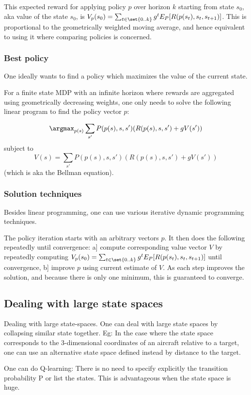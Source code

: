 \documentclass[oneside, article]{memoir}
\begin{document}
This expected reward for applying policy $p$ over horizon $k$ starting from state $s_0$, aka value of the state $s_0$, is $V_p(s_0) = \sum_{t \in \set{0..k}} g^t E_P[R(p(s_t), s_t, s_{t+1})]$. This is proportional to the geometrically weighted moving average, and hence equivalent to using it where comparing policies is concerned.

\subsubsection{Best policy}
One ideally wants to find a policy which maximizes the value of the current state.

For a finite state MDP with an infinite horizon where rewards are aggregated using geometrically decreasing weights, one only needs to solve the following linear program to find the policy vector $p$:

$$\argmax_{p(s)} \sum_{s'} P(p(s), s, s')(R(p(s), s, s') + gV(s'))$$ subject to $$V(s) = \sum_{s'} P(p(s), s, s')(R(p(s), s, s') + gV(s'))$$ (which is aka the Bellman equation).

\subsubsection{Solution techniques}
Besides linear programming, one can use various iterative dynamic programming techniques.

The policy iteration starts with an arbitrary vectors $p$. It then does the following repeatedly until convergence: a] compute corresponding value vector $V$ by repeatedly computing $V_p(s_0) = \sum_{t \in \set{0..k}} g^t E_P[R(p(s_t), s_t, s_{t+1})]$ until convergence, b] improve $p$ using current estimate of $V$. As each step improves the solution, and because there is only one minimum, this is guaranteed to converge.

\subsection{Dealing with large state spaces}
Dealing with large state-spaces. One can deal with large state spaces by collapsing similar state together. Eg: In the case where the state space corresponds  to the 3-dimensional coordinates of an aircraft relative to a target, one can use an alternative state space defined instead by distance to the target.

One can do Q-learning: There is no need to specify explicitly the transition probability P or list the states. This is advantageous when the state space is huge.
\end{document}

